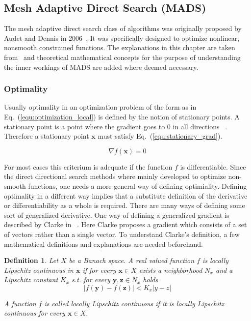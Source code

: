 \documentclass[a4paper,10pt]{article}
\newtheorem{definition}{Definition}
\renewcommand{\vec}[1]{\mathbf{#1}}
\newcommand{\equref}[1]{Eq.~(\ref{#1})}
\begin{document}
    \subsection{Mesh Adaptive Direct Search (MADS)} \label{sec:mads}

    The mesh adaptive direct search class of algorithms was originally
    proposed by Audet and Dennis in 2006~\cite{mads_original}.
    It was specifically designed to optimize nonlinear, nonsmooth
    constrained functions.
    The explanations in this chapter are taken from~\cite{mads_original}
    and theoretical mathematical concepts for the purpose of understanding
    the inner workings of MADS are added where deemed necessary.

    \subsubsection{Optimality}

    Usually optimality in an optimization problem of the form as in
    \equref{equ:optimization_local} is defined by the notion of stationary
    points.
    A stationary point is a point where the gradient goes to 0 in all
    directions ~\cite{solomon_numerical}.
    Therefore a stationary point $\vec{x}$ must satisfy \equref{equ:stationary_grad}.

    \begin{equation}
        \label{equ:stationary_grad}
        \nabla f(\vec{x}) = 0
    \end{equation}

    For most cases this criterium is adequate if the function $f$ is differentiable.
    Since the direct directional search methods where mainly developed
    to optimize non-smooth functions, one needs a more general way
    of defining optimiality.
    Defining optimality in a different way implies that a substitute
    definition of the derivative or differentiability as a whole
    is required.
    There are many ways of defining some sort of generalized derivative.
    One way of defining a generalized gradient is described by Clarke
    in ~\cite{clarke}.
    Here Clarke proposes a gradient which consists of a set of vectors
    rather than a single vector.
    To understand Clarke's definition, a few mathematical definitions
    and explanations are needed beforehand.
    
    \begin{definition}
        \label{def:local_lipschitz}
        Let $X$ be a Banach space.
        A real valued function $f$ is locally Lipschitz continuous in $\vec{x}$
        if for every $\vec{x} \in X$ exists a neighborhood $N_x$ and a Lipschitz
        constant $K_x$ s.t. for every $\vec{y}, \vec{z} \in N_x$ holds 
        \begin{equation}
            |f(\vec{y}) - f(\vec{z})| < K_x|y - z|
        \end{equation}

        A function $f$ is called locally Lipschitz continuous if it is
        locally Lipschitz continuous for every $\vec{x} \in X$.
    \end{definition}
    
\end{document}
